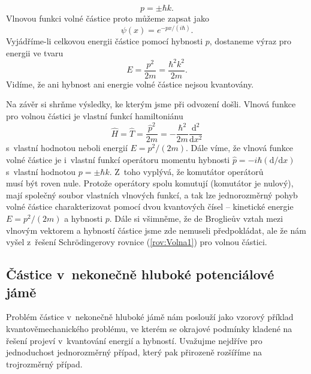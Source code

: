 \begin{equation}
p = \pm \hbar k \mbox{.}
\label{rov:Volna9}
\end{equation}
Vlnovou funkci volné částice proto můžeme zapsat jako
\begin{equation}
\boxed{\psi(x) = e^{-px/(i\hbar)} \mbox{.}}
\label{rov:Volna10}
\end{equation}
Vyjádříme-li celkovou energii částice pomocí hybnosti $p$, dostaneme výraz pro energii ve tvaru
\begin{equation}
\boxed{E = \frac{p^2}{2m} = \frac{\hbar^2k^2}{2m} \mbox{.}}
\label{rov:Volna11}
\end{equation}
Vidíme, že ani hybnost ani energie volné částice nejsou kvantovány.

Na závěr si shrňme výsledky, ke kterým jsme při odvození došli. Vlnová funkce pro volnou částici je vlastní funkcí hamiltoniánu
\begin{equation}
\hat{H} = \hat{T} = \frac{\hat{p}^2}{2m} = -\frac{\hbar^2}{2m}\frac{\mathrm{d}^2}{\mathrm{d}x^2}
\label{rov:Volna12}
\end{equation}
s~vlastní hodnotou neboli energií $E = p^2/(2m)$. Dále víme, že vlnová funkce volné částice je i~vlastní funkcí operátoru momentu hybnosti $\hat{p} = -i\hbar ({\mathrm{d}}/{\mathrm{d}x})$ s~vlastní hodnotou $p = \pm \hbar k$. Z~toho vyplývá, že komutátor operátorů
\begin{equation}
[\hat{T},\hat{p}]
\label{rov:Volna13}
\end{equation}
musí být roven nule. Protože operátory spolu komutují (komutátor je nulový), mají společný soubor vlastních vlnových funkcí, a tak lze jednorozměrný pohyb volné částice charakterizovat pomocí dvou kvantových čísel -- kinetické energie $E = p^2/(2m)$ a hybnosti $p$. Dále si všimněme, že de Broglieův vztah mezi vlnovým vektorem a hybností částice jsme zde nemuseli předpokládat, ale že nám vyšel z~řešení Schrödingerovy rovnice (\ref{rov:Volna1}) pro volnou částici.

\subsection{Částice v~nekonečně hluboké potenciálové jámě}
\label{kap:CasticeJama}

Problém částice v~nekonečně hluboké jámě nám poslouží jako vzorový příklad kvantověmechanického problému, ve kterém se okrajové podmínky kladené na řešení projeví v~kvantování energií a hybností. Uvažujme nejdříve pro jednoduchost jednorozměrný případ, který pak přirozeně rozšíříme na trojrozměrný případ.

